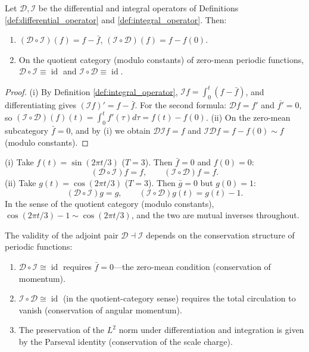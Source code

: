 \begin{lemma}\label{ch13_diff_int_inverse_lemma}
Let $\mathcal{D}, \mathcal{I}$ be the differential and integral operators of Definitions \ref{def:differential_operator} and \ref{def:integral_operator}. Then:
\begin{enumerate}[label=(\roman*)]
    \item $(\mathcal{D} \circ \mathcal{I})(f) = f - \bar{f}$, $(\mathcal{I} \circ \mathcal{D})(f) = f - f(0)$.
    \item On the quotient category (modulo constants) of zero-mean periodic functions, $\mathcal{D} \circ \mathcal{I} \equiv \operatorname{id}$ and $\mathcal{I} \circ \mathcal{D} \equiv \operatorname{id}$.
\end{enumerate}
\end{lemma}

\begin{proof}
(i) By Definition \ref{def:integral_operator}, $\mathcal{I}f = \int_0^t (f - \bar{f})$, and differentiating gives $(\mathcal{I}f)' = f - \bar{f}$. For the second formula: $\mathcal{D}f = f'$ and $\overline{f'} = 0$, so $(\mathcal{I}\circ\mathcal{D})(f)(t) = \int_0^t f'(\tau)d\tau = f(t) - f(0)$.
(ii) On the zero-mean subcategory $\bar{f} = 0$, and by (i) we obtain $\mathcal{D}\mathcal{I}f = f$ and $\mathcal{I}\mathcal{D}f = f - f(0) \sim f$ (modulo constants).
\end{proof}

\begin{example}\label{ch13_adjunction_numeric_example}
(i) Take $f(t) = \sin(2\pi t/3)$ ($T = 3$). Then $\bar{f} = 0$ and $f(0) = 0$:
\[
(\mathcal{D}\circ\mathcal{I})f = f, \qquad (\mathcal{I}\circ\mathcal{D})f = f.
\]
(ii) Take $g(t) = \cos(2\pi t/3)$ ($T = 3$). Then $\bar{g} = 0$ but $g(0) = 1$:
\[
(\mathcal{D}\circ\mathcal{I})g = g, \qquad (\mathcal{I}\circ\mathcal{D})g(t) = g(t) - 1.
\]
In the sense of the quotient category (modulo constants), $\cos(2\pi t/3) - 1 \sim \cos(2\pi t/3)$, and the two are mutual inverses throughout.
\end{example}

\begin{corollary}\label{cor:diff_int_conservation}
The validity of the adjoint pair $\mathcal{D} \dashv \mathcal{I}$ depends on the conservation structure of periodic functions:
\begin{enumerate}[label=(\roman*)]
    \item $\mathcal{D} \circ \mathcal{I} \cong \operatorname{id}$ requires $\bar{f} = 0$---the zero-mean condition (conservation of momentum).
    \item $\mathcal{I} \circ \mathcal{D} \cong \operatorname{id}$ (in the quotient-category sense) requires the total circulation to vanish (conservation of angular momentum).
    \item The preservation of the $L^2$ norm under differentiation and integration is given by the Parseval identity (conservation of the scale charge).
\end{enumerate}
\end{corollary}

